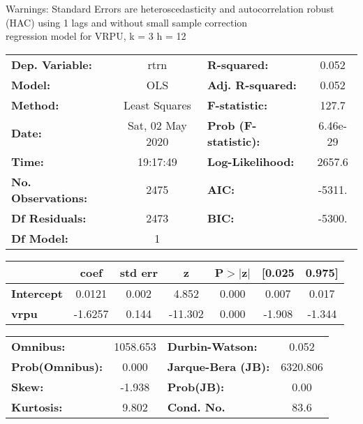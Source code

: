 Warnings: \newline
 [1] Standard Errors are heteroscedasticity and autocorrelation robust (HAC) using 1 lags and without small sample correction\\ 

regression model for VRPU, k = 3 h = 12\begin{center}
\begin{tabular}{lclc}
\toprule
\textbf{Dep. Variable:}    &       rtrn       & \textbf{  R-squared:         } &     0.052   \\
\textbf{Model:}            &       OLS        & \textbf{  Adj. R-squared:    } &     0.052   \\
\textbf{Method:}           &  Least Squares   & \textbf{  F-statistic:       } &     127.7   \\
\textbf{Date:}             & Sat, 02 May 2020 & \textbf{  Prob (F-statistic):} &  6.46e-29   \\
\textbf{Time:}             &     19:17:49     & \textbf{  Log-Likelihood:    } &    2657.6   \\
\textbf{No. Observations:} &        2475      & \textbf{  AIC:               } &    -5311.   \\
\textbf{Df Residuals:}     &        2473      & \textbf{  BIC:               } &    -5300.   \\
\textbf{Df Model:}         &           1      & \textbf{                     } &             \\
\bottomrule
\end{tabular}
\begin{tabular}{lcccccc}
                   & \textbf{coef} & \textbf{std err} & \textbf{z} & \textbf{P$> |$z$|$} & \textbf{[0.025} & \textbf{0.975]}  \\
\midrule
\textbf{Intercept} &       0.0121  &        0.002     &     4.852  &         0.000        &        0.007    &        0.017     \\
\textbf{vrpu}      &      -1.6257  &        0.144     &   -11.302  &         0.000        &       -1.908    &       -1.344     \\
\bottomrule
\end{tabular}
\begin{tabular}{lclc}
\textbf{Omnibus:}       & 1058.653 & \textbf{  Durbin-Watson:     } &    0.052  \\
\textbf{Prob(Omnibus):} &   0.000  & \textbf{  Jarque-Bera (JB):  } & 6320.806  \\
\textbf{Skew:}          &  -1.938  & \textbf{  Prob(JB):          } &     0.00  \\
\textbf{Kurtosis:}      &   9.802  & \textbf{  Cond. No.          } &     83.6  \\
\bottomrule
\end{tabular}
\end{center}

